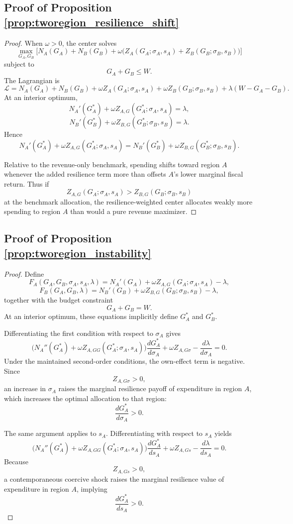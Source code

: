 \documentclass[12pt]{article}
\begin{document}
\subsection{Proof of Proposition \ref{prop:tworegion_resilience_shift}}

\begin{proof}
When $\omega>0$, the center solves
\[
\max_{G_A,G_B}
\Big[
N_A(G_A)+N_B(G_B)+\omega\bigl(Z_A(G_A;\sigma_A,s_A)+Z_B(G_B;\sigma_B,s_B)\bigr)
\Big]
\]
subject to
\[
G_A+G_B\le W.
\]
The Lagrangian is
\[
\mathcal L=
N_A(G_A)+N_B(G_B)+\omega Z_A(G_A;\sigma_A,s_A)+\omega Z_B(G_B;\sigma_B,s_B)
+\lambda(W-G_A-G_B).
\]
At an interior optimum,
\[
N_A'(G_A^*)+\omega Z_{A,G}(G_A^*;\sigma_A,s_A)=\lambda,
\]
\[
N_B'(G_B^*)+\omega Z_{B,G}(G_B^*;\sigma_B,s_B)=\lambda.
\]
Hence
\[
N_A'(G_A^*)+\omega Z_{A,G}(G_A^*;\sigma_A,s_A)
=
N_B'(G_B^*)+\omega Z_{B,G}(G_B^*;\sigma_B,s_B).
\]

Relative to the revenue-only benchmark, spending shifts toward region $A$ whenever the added resilience term more than offsets $A$'s lower marginal fiscal return. Thus if
\[
Z_{A,G}(G_A;\sigma_A,s_A)>Z_{B,G}(G_B;\sigma_B,s_B)
\]
at the benchmark allocation, the resilience-weighted center allocates weakly more spending to region $A$ than would a pure revenue maximizer.
\end{proof}

\subsection{Proof of Proposition \ref{prop:tworegion_instability}}

\begin{proof}
Define
\[
F_A(G_A,G_B,\sigma_A,s_A,\lambda)
=
N_A'(G_A)+\omega Z_{A,G}(G_A;\sigma_A,s_A)-\lambda,
\]
\[
F_B(G_A,G_B,\lambda)
=
N_B'(G_B)+\omega Z_{B,G}(G_B;\sigma_B,s_B)-\lambda,
\]
together with the budget constraint
\[
G_A+G_B=W.
\]
At an interior optimum, these equations implicitly define $G_A^*$ and $G_B^*$.

Differentiating the first condition with respect to $\sigma_A$ gives
\[
\Big(N_A''(G_A^*)+\omega Z_{A,GG}(G_A^*;\sigma_A,s_A)\Big)\frac{dG_A^*}{d\sigma_A}
+\omega Z_{A,G\sigma}
-\frac{d\lambda}{d\sigma_A}
=0.
\]
Under the maintained second-order conditions, the own-effect term is negative. Since
\[
Z_{A,G\sigma}>0,
\]
an increase in $\sigma_A$ raises the marginal resilience payoff of expenditure in region $A$, which increases the optimal allocation to that region:
\[
\frac{dG_A^*}{d\sigma_A}>0.
\]

The same argument applies to $s_A$. Differentiating with respect to $s_A$ yields
\[
\Big(N_A''(G_A^*)+\omega Z_{A,GG}(G_A^*;\sigma_A,s_A)\Big)\frac{dG_A^*}{ds_A}
+\omega Z_{A,Gs}
-\frac{d\lambda}{ds_A}
=0.
\]
Because
\[
Z_{A,Gs}>0,
\]
a contemporaneous coercive shock raises the marginal resilience value of expenditure in region $A$, implying
\[
\frac{dG_A^*}{ds_A}>0.
\]
\end{proof}
\end{document}
